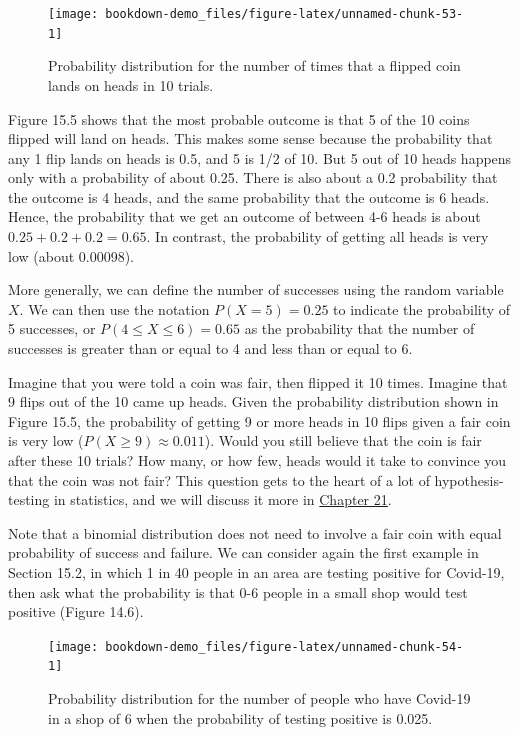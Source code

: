 \documentclass[
  openany]{krantz}
\begin{document}
\begin{figure}
\texttt{[image: bookdown-demo\_files/figure-latex/unnamed-chunk-53-1]} \caption{Probability distribution for the number of times that a flipped coin lands on heads in 10 trials.}\label{fig:unnamed-chunk-53}
\end{figure}

Figure 15.5 shows that the most probable outcome is that 5 of the 10 coins flipped will land on heads.
This makes some sense because the probability that any 1 flip lands on heads is 0.5, and 5 is 1/2 of 10.
But 5 out of 10 heads happens only with a probability of about 0.25.
There is also about a 0.2 probability that the outcome is 4 heads, and the same probability that the outcome is 6 heads.
Hence, the probability that we get an outcome of between 4-6 heads is about \(0.25 + 0.2 + 0.2 = 0.65\).
In contrast, the probability of getting all heads is very low (about 0.00098).

More generally, we can define the number of successes using the random variable \(X\).
We can then use the notation \(P(X = 5) = 0.25\) to indicate the probability of 5 successes, or \(P(4 \leq X \leq 6) = 0.65\) as the probability that the number of successes is greater than or equal to 4 and less than or equal to 6.

Imagine that you were told a coin was fair, then flipped it 10 times.
Imagine that 9 flips out of the 10 came up heads.
Given the probability distribution shown in Figure 15.5, the probability of getting 9 or more heads in 10 flips given a fair coin is very low (\(P(X \geq 9) \approx 0.011\)).
Would you still believe that the coin is fair after these 10 trials?
How many, or how few, heads would it take to convince you that the coin was not fair?
This question gets to the heart of a lot of hypothesis-testing in statistics, and we will discuss it more in \protect\hyperlink{Chapter_21}{Chapter 21}.

Note that a binomial distribution does not need to involve a fair coin with equal probability of success and failure.
We can consider again the first example in Section 15.2, in which 1 in 40 people in an area are testing positive for Covid-19, then ask what the probability is that 0-6 people in a small shop would test positive (Figure 14.6).

\begin{figure}
\texttt{[image: bookdown-demo\_files/figure-latex/unnamed-chunk-54-1]} \caption{Probability distribution for the number of people who have Covid-19 in a shop of 6 when the probability of testing positive is 0.025.}\label{fig:unnamed-chunk-54}
\end{figure}
\end{document}
